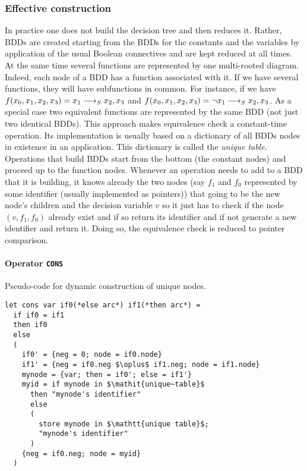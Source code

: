 \documentclass[a4paper,10pt]{article}
\begin{document}
\subsubsection{Effective construction}
In practice one does not build the decision tree and then reduces it.
Rather, BDDs are created starting from the BDDs for the constants and the variables by application of the usual Boolean connectives and are kept reduced at all times.
At the same time several functions are represented by one multi-rooted diagram.
Indeed, each node of a BDD has a function associated with it.
If we have several functions, they will have subfunctions in common.
For instance, if we have $f(x_0, x_1, x_2, x_3) = x_1 \longrightarrow_S x_2, x_3$ and $f(x_0, x_1, x_2, x_3) = \lnot x_1 \longrightarrow_S x_2, x_3$. As a special case two equivalent functions are represented by the same BDD (not just two identical BDDs).
This approach makes equivalence check a constant-time operation.
Its implementation is usually based on a dictionary of all BDDs nodes in existence in an application.
This dictionary is called the \textit{unique table}.
Operations that build BDDs start from the bottom (the constant nodes) and proceed up to the function nodes.
Whenever an operation needs to add to a BDD that it is building, it knows already the two nodes (say $f_1$ and $f_0$ represented by some identifier (usually implemented as pointers)) that going to be the new node's children and the decision variable $v$ so it just has to check if the node $(v, f_1, f_0)$ already exist and if so return its identifier and if not generate a new identifier and return it.
Doing so, the equivalence check is reduced to pointer comparison.

\paragraph{Operator \texttt{CONS}\\}


Pseudo-code for dynamic construction of unique nodes.

\begin{lstlisting}
let cons var if0(*else arc*) if1(*then arc*) =
  if if0 = if1
  then if0
  else
  (
    if0' = {neg = 0; node = if0.node}
    if1' = {neg = if0.neg $\oplus$ if1.neg; node = if1.node}
    mynode = {var; then = if0'; else = if1'}
    myid = if mynode in $\mathit{unique~table}$
      then "mynode's identifier"
      else
      (
        store mynode in $\mathtt{unique table}$;
        "mynode's identifier"
      )
    {neg = if0.neg; node = myid}
  )
\end{lstlisting}
\end{document}
